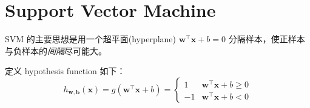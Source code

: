 \section{Support Vector Machine}
	SVM 的主要思想是用一个超平面(hyperplane) $ \bm{w}^\intercal \bm{x} + b = 0 $ 分隔样本，使正样本与负样本的\emph{间隔}尽可能大。
	
	定义 hypothesis function 如下：
	\begin{equation}
		h_{\bm{w},\bm{b}} (\bm{x}) = g( \bm{w}^\intercal \bm{x} + b ) = 
		\begin{cases}
			1 & \bm{w}^\intercal \bm{x} + b \geq 0 \\
			-1 & \bm{w}^\intercal \bm{x} + b < 0
		\end{cases}
	\end{equation}
	